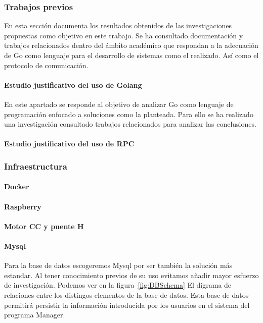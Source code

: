 \subsubsection{Trabajos previos}
    En esta sección documenta los resultados obtenidos de las investigaciones propuestas como objetivo en este trabajo.
    Se ha consultado documentación y trabajos relacionados dentro del ámbito académico que respondan a la adecuación de Go como lenguaje para el desarrollo de sistemas como el realizado.
    Así como el protocolo de comunicación.
    \paragraph{Estudio justificativo del uso de Golang}
    En este apartado se responde al objetivo de analizar Go como lenguaje de programación enfocado a soluciones como la planteada.
    Para ello se ha realizado una investigación consultado trabajos relacionados para analizar las conclusiones.
    
    \paragraph{Estudio justificativo del uso de RPC}
        
\subsubsection{Infraestructura}\label{subsubsec:infraestructura}
    \paragraph{Docker}\label{par:Docker}
        
    \paragraph{Raspberry}
        
    \paragraph{Motor CC y puente H}
        
        
    \paragraph{Mysql}\label{par:mysql}
        Para la base de datos escogeremos Mysql por ser también la solución más estandar.
        Al tener conocimiento previos de su uso evitamos añadir mayor esfuerzo de investigación.
        Podemos ver en la figura~\cref{fig:DBSchema} El digrama de relaciones entre los distingos elementos de la base de datos.
        Esta base de datos permitirá persistir la información introducida por los usuarios en el sistema del programa Manager.\\

